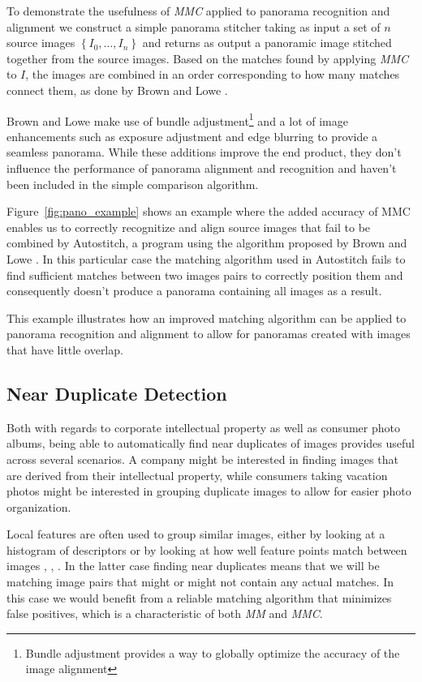\documentclass{article}
\begin{document}
To demonstrate the usefulness of \emph{MMC} applied to panorama 
recognition and alignment we construct a simple panorama stitcher taking
as input a set of $n$ source images $\left\{I_0, \ldots, I_n\right\}$ 
and returns as output a panoramic image stitched together from the 
source images. Based on the matches found by applying \emph{MMC} to $I$, 
the images are combined in an order corresponding to how many matches 
connect them, as done by Brown and Lowe \cite{brown2007automatic}.

Brown and Lowe make use of bundle adjustment\footnote{Bundle adjustment 
provides a way to globally optimize the accuracy of the image alignment} 
and a lot of image enhancements such as exposure adjustment and edge 
blurring to provide a seamless panorama. While these additions improve 
the end product, they don't influence the performance of panorama 
alignment and recognition and haven't been included in the simple 
comparison algorithm.

Figure~\ref{fig:pano_example} shows an example where the added accuracy 
of MMC enables us to correctly recognitize and align source images that 
fail to be combined by Autostitch, a program using the algorithm 
proposed by Brown and Lowe \cite{brown2007automatic}. In this particular
case the matching algorithm used in Autostitch fails to find sufficient 
matches between two images pairs to correctly position them and 
consequently doesn't produce a panorama containing all images as a 
result.

This example illustrates how an improved matching algorithm can be 
applied to panorama recognition and alignment to allow for panoramas 
created with images that have little overlap.

\subsection{Near Duplicate Detection}
Both with regards to corporate intellectual property as well as consumer 
photo albums, being able to automatically find near duplicates of images 
provides useful across several scenarios. A company might be interested 
in finding images that are derived from their intellectual property, 
while consumers taking vacation photos might be interested in grouping 
duplicate images to allow for easier photo organization.

Local features are often used to group similar images, either by looking
at a histogram of descriptors \cite{wu2009bundling} or by looking at how
well feature points match between images \cite{zhao2009scale},
\cite{chu2010consumer}, \cite{vas2013cluster}. In the latter case 
finding near duplicates means that we will be matching image pairs that 
might or might not contain any actual matches. In this case we would 
benefit from a reliable matching algorithm that minimizes false 
positives, which is a characteristic of both \emph{MM} and \emph{MMC}.
\end{document}
